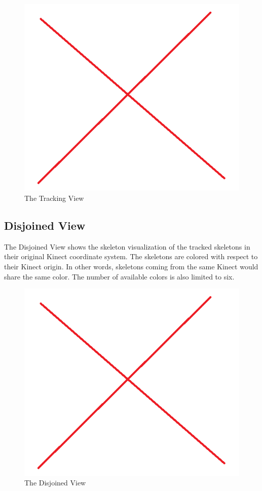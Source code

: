 \begin{figure}[!h]
  \centering
  \includegraphics[width=0.8\linewidth]{figs/tracking_view}
  \caption{The Tracking View}
  \label{fig:tracking_view}
\end{figure}

\subsection{Disjoined View}
\label{sec:implementation_disjoined_view}

The Disjoined View shows the skeleton visualization of the tracked skeletons in their original Kinect coordinate system. The skeletons are colored with respect to their Kinect origin. In other words, skeletons coming from the same Kinect would share the same color. The number of available colors is also limited to six.

\begin{figure}[!h]
  \centering
  \includegraphics[width=0.8\linewidth]{figs/disjoined_view}
  \caption{The Disjoined View}
  \label{fig:disjoined_view}
\end{figure}

